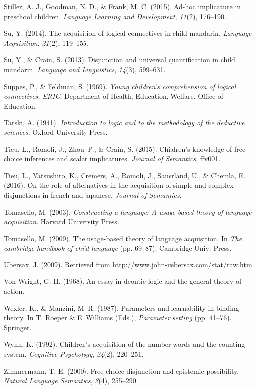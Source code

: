 \documentclass[oneside]{report}
\theoremstyle{definition}
\theoremstyle{definition}
\theoremstyle{definition}
\theoremstyle{remark}
\begin{document}
\hypertarget{ref-stiller2015ad}{}
Stiller, A. J., Goodman, N. D., \& Frank, M. C. (2015). Ad-hoc
implicature in preschool children. \emph{Language Learning and
Development}, \emph{11}(2), 176--190.

\hypertarget{ref-su2014acquisition}{}
Su, Y. (2014). The acquisition of logical connectives in child mandarin.
\emph{Language Acquisition}, \emph{21}(2), 119--155.

\hypertarget{ref-su2013disjunction}{}
Su, Y., \& Crain, S. (2013). Disjunction and universal quantification in
child mandarin. \emph{Language and Linguistics}, \emph{14}(3), 599--631.

\hypertarget{ref-suppes1969young}{}
Suppes, P., \& Feldman, S. (1969). \emph{Young children's comprehension
of logical connectives.} \emph{ERIC}. Department of Health, Education,
Welfare. Office of Education.

\hypertarget{ref-tarski1941logic}{}
Tarski, A. (1941). \emph{Introduction to logic and to the methodology of
the deductive sciences}. Oxford University Press.

\hypertarget{ref-tieu2015children}{}
Tieu, L., Romoli, J., Zhou, P., \& Crain, S. (2015). Children's
knowledge of free choice inferences and scalar implicatures.
\emph{Journal of Semantics}, ffv001.

\hypertarget{ref-tieu2016}{}
Tieu, L., Yatsushiro, K., Cremers, A., Romoli, J., Sauerland, U., \&
Chemla, E. (2016). On the role of alternatives in the acquisition of
simple and complex disjunctions in french and japanese. \emph{Journal of
Semantics}.

\hypertarget{ref-tomasello2003constructing}{}
Tomasello, M. (2003). \emph{Constructing a language: A usage-based
theory of language acquisition}. Harvard University Press.

\hypertarget{ref-tomasello2009usage}{}
Tomasello, M. (2009). The usage-based theory of language acquisition. In
\emph{The cambridge handbook of child language} (pp. 69--87). Cambridge
Univ. Press.

\hypertarget{ref-ubersax2009}{}
Ubersax, J. (2009). Retrieved from
\url{http://www.john-uebersax.com/stat/raw.htm}

\hypertarget{ref-von1968essay}{}
Von Wright, G. H. (1968). An essay in deontic logic and the general
theory of action.

\hypertarget{ref-wexler1987parameters}{}
Wexler, K., \& Manzini, M. R. (1987). Parameters and learnability in
binding theory. In T. Roeper \& E. Williams (Eds.), \emph{Parameter
setting} (pp. 41--76). Springer.

\hypertarget{ref-wynn1992children}{}
Wynn, K. (1992). Children's acquisition of the number words and the
counting system. \emph{Cognitive Psychology}, \emph{24}(2), 220--251.

\hypertarget{ref-zimmermann2000free}{}
Zimmermann, T. E. (2000). Free choice disjunction and epistemic
possibility. \emph{Natural Language Semantics}, \emph{8}(4), 255--290.


\end{document}
